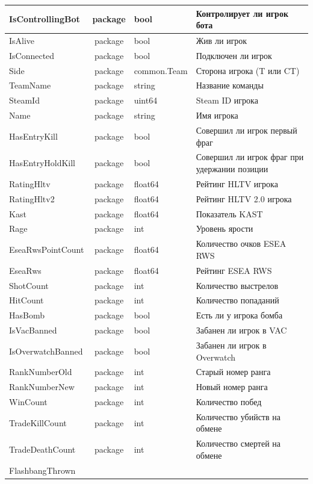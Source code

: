 \begin{xltabular}{\textwidth}{|X|c|X|X|}
	IsControllingBot & package & bool & Контролирует ли игрок бота \\ \hline
	IsAlive & package & bool & Жив ли игрок \\ \hline
	IsConnected & package & bool & Подключен ли игрок \\ \hline
	Side & package & common.Team & Сторона игрока (T или CT) \\ \hline
	TeamName & package & string & Название команды \\ \hline
	SteamId & package & uint64 & Steam ID игрока \\ \hline
	Name & package & string & Имя игрока \\ \hline
	HasEntryKill & package & bool & Совершил ли игрок первый фраг \\ \hline
	HasEntryHoldKill & package & bool & Совершил ли игрок фраг при удержании позиции \\ \hline
	RatingHltv & package & float64 & Рейтинг HLTV игрока \\ \hline
	RatingHltv2 & package & float64 & Рейтинг HLTV 2.0 игрока \\ \hline
	Kast & package & float64 & Показатель KAST \\ \hline
	Rage & package & int & Уровень ярости \\ \hline
	EseaRwsPointCount & package & float64 & Количество очков ESEA RWS \\ \hline
	EseaRws & package & float64 & Рейтинг ESEA RWS \\ \hline
	ShotCount & package & int & Количество выстрелов \\ \hline
	HitCount & package & int & Количество попаданий \\ \hline
	HasBomb & package & bool & Есть ли у игрока бомба \\ \hline
	IsVacBanned & package & bool & Забанен ли игрок в VAC \\ \hline
	IsOverwatchBanned & package & bool & Забанен ли игрок в Overwatch \\ \hline
	RankNumberOld & package & int & Старый номер ранга \\ \hline
	RankNumberNew & package & int & Новый номер ранга \\ \hline
	WinCount & package & int & Количество побед \\ \hline
	TradeKillCount & package & int & Количество убийств на обмене \\ \hline
	TradeDeathCount & package & int & Количество смертей на обмене \\ \hline
	FlashbangThrown

\end{xltabular}
